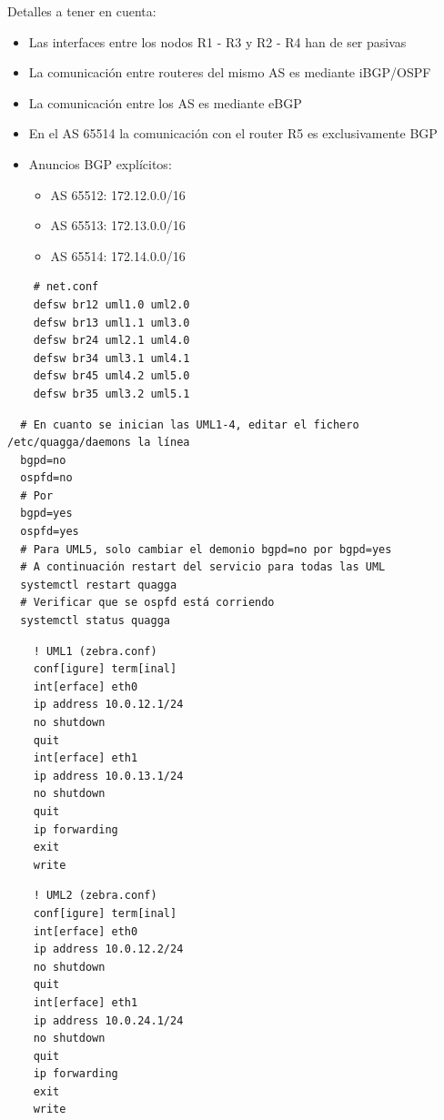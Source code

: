 \documentclass{article}
\begin{document}
  Detalles a tener en cuenta:
  
  \begin{itemize}
    \item Las interfaces entre los nodos R1 - R3 y R2 - R4 han de ser pasivas
    \item La comunicación entre routeres del mismo AS es mediante iBGP/OSPF
    \item La comunicación entre los AS es mediante eBGP
    \item En el AS 65514 la comunicación con el router R5 es exclusivamente BGP
    \item Anuncios BGP explícitos:
    \begin{itemize}
      \item AS 65512: 172.12.0.0/16
      \item AS 65513: 172.13.0.0/16
      \item AS 65514: 172.14.0.0/16
    \end{itemize}
  \end{itemize}

  \begin{verbatim}
    # net.conf
    defsw br12 uml1.0 uml2.0
    defsw br13 uml1.1 uml3.0
    defsw br24 uml2.1 uml4.0
    defsw br34 uml3.1 uml4.1
    defsw br45 uml4.2 uml5.0
    defsw br35 uml3.2 uml5.1
  \end{verbatim}
  
  \begin{verbatim}
  # En cuanto se inician las UML1-4, editar el fichero /etc/quagga/daemons la línea
  bgpd=no
  ospfd=no
  # Por
  bgpd=yes
  ospfd=yes
  # Para UML5, solo cambiar el demonio bgpd=no por bgpd=yes
  # A continuación restart del servicio para todas las UML
  systemctl restart quagga
  # Verificar que se ospfd está corriendo
  systemctl status quagga
\end{verbatim}
  
  \begin{verbatim}
    ! UML1 (zebra.conf)
    conf[igure] term[inal]
    int[erface] eth0
    ip address 10.0.12.1/24
    no shutdown
    quit
    int[erface] eth1
    ip address 10.0.13.1/24
    no shutdown
    quit
    ip forwarding
    exit
    write
  \end{verbatim}
  
  \begin{verbatim}
    ! UML2 (zebra.conf)
    conf[igure] term[inal]
    int[erface] eth0
    ip address 10.0.12.2/24
    no shutdown
    quit
    int[erface] eth1
    ip address 10.0.24.1/24
    no shutdown
    quit
    ip forwarding
    exit
    write
  \end{verbatim}
\end{document}
